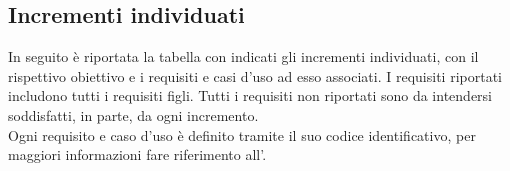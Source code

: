 
\subsection{Incrementi individuati} \label{subsection:incrementi}
In seguito è riportata la tabella con indicati gli incrementi individuati, con il rispettivo obiettivo e i requisiti e casi d'uso ad esso associati.
I requisiti riportati includono tutti i requisiti figli. Tutti i requisiti non riportati sono da intendersi soddisfatti, in parte, da
ogni incremento. \\
Ogni requisito e caso d'uso è definito tramite il suo codice identificativo, per maggiori informazioni fare riferimento all'\docNameVersionAdR{}.

